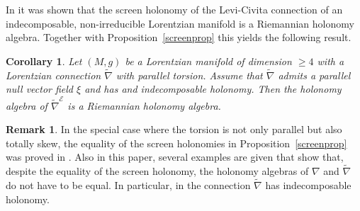 \documentclass[11pt,a4paper]{amsart}
\newcommand{\tnab}{\widetilde{\nabla}}
\newcommand{\+}{\oplus}
\newcommand{\gl}{\mathfrak{gl}}
\newcommand{\1}{\mathbf{1}}
\newcommand{\F}{\mathcal{F}}
\newcommand{\E}{\mathcal{E}}
\newcommand{\<}{\langle}
\renewcommand{\>}{\rangle}
\theoremstyle{definition}
\newtheorem{remark}[definition]{Remark}
\theoremstyle{plain}
\newtheorem{corollary}[definition]{Corollary}
\numberwithin{equation}{section}
\begin{document}
In \cite{leistnerjdg} it was shown that the screen holonomy of the Levi-Civita connection of an indecomposable, non-irreducible Lorentzian manifold is a Riemannian holonomy algebra. Together with Proposition~\ref{screenprop} this yields the following result.
\begin{corollary}\label{screencor}Let $(M,g)$ be a Lorentzian manifold of dimension $\ge 4$ with  a Lorentzian connection  $\tnab$ with parallel torsion. Assume that $
\tnab$ admits a parallel null vector field $\xi$ and has and indecomposable holonomy.
Then the holonomy algebra of 
$ \tnab^{\E}$ is a Riemannian holonomy algebra.
\end{corollary}


\begin{remark}
In the special case where the torsion is not only parallel but also totally skew, the equality of the screen holonomies in Proposition~\ref{screenprop} was proved in \cite[Proposition 2]{ErnstGalaev22}. Also in this paper, several examples are given that show that, despite the equality of the screen holonomy,   the holonomy algebras of $\nabla$ and $\tnab$ do not have to be equal. In particular, in \cite[Example 1]{ErnstGalaev22} the connection $\tnab$ has indecomposable holonomy.
\end{remark}


\end{document}
